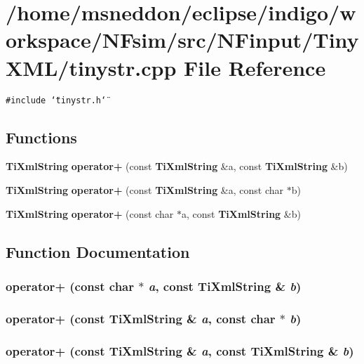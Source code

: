 \section{/home/msneddon/eclipse/indigo/workspace/NFsim/src/NFinput/TinyXML/tinystr.cpp File Reference}
\label{tinystr_8cpp}


{\tt \#include \char`\"{}tinystr.h\char`\"{}}\par
\subsection*{Functions}
\begin{CompactItemize}
\item 
{\bf TiXmlString} {\bf operator+} (const {\bf TiXmlString} \&a, const {\bf TiXmlString} \&b)
\item 
{\bf TiXmlString} {\bf operator+} (const {\bf TiXmlString} \&a, const char $\ast$b)
\item 
{\bf TiXmlString} {\bf operator+} (const char $\ast$a, const {\bf TiXmlString} \&b)
\end{CompactItemize}


\subsection{Function Documentation}
\subsubsection{ operator+ (const char $\ast$ {\em a}, const {\bf TiXmlString} \& {\em b})}\label{tinystr_8cpp_c0f2988a051a761664d80de81462fc4d}


\subsubsection{ operator+ (const {\bf TiXmlString} \& {\em a}, const char $\ast$ {\em b})}\label{tinystr_8cpp_b77ef9617d62643b24e52118db159b7b}


\subsubsection{ operator+ (const {\bf TiXmlString} \& {\em a}, const {\bf TiXmlString} \& {\em b})}\label{tinystr_8cpp_6ee35bce93b3aaf8a2353471c0dd2d58}


